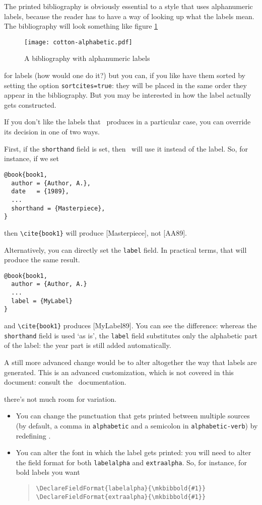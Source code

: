 The printed bibliography is obviously essential to a style that uses
alphanumeric labels, because the reader has to have a way of looking
up what the labels mean. The bibliography will look something like
figure \ref{example:bibliography:alphabetic}

\begin{figure}
\caption{A bibliography with alphanumeric
  labels\label{example:bibliography:alphabetic}}
\texttt{[image: cotton-alphabetic.pdf]}
\end{figure}

 for labels (how
would one do it?) but you can, if you like have them sorted by setting
the option \verb|sortcites=true|: they will be placed in the same
order they appear in the bibliography. But you may be interested in
how the label actually gets constructed.

If you don't like the labels that \biblatex\ produces in a particular
case, you can override its decision in one of two ways.

First, if the \verb|shorthand| field is set, then \biblatex\ will use
it instead of the label. So, for instance, if we set
\begin{verbatim}
@book{book1,
  author = {Author, A.},
  date   = {1989},
  ...
  shorthand = {Masterpiece},
}
\end{verbatim}
then \verb|\cite{book1}| will produce [Masterpiece], not [AA89].

Alternatively, you can directly set the \verb|label| field. In
practical terms, that will produce the same result.
\begin{verbatim}
@book{book1,
  author = {Author, A.} 
  ...
  label = {MyLabel}
}
\end{verbatim}
and \verb|\cite{book1}| produces [MyLabel89]. You can see the difference:
whereas the \verb|shorthand| field is used `as is', the \verb|label|
field substitutes only the alphabetic part of the label: the year part
is still added automatically.

A still more advanced change would be to alter altogether the way that
labels are generated. This is an advanced customization, which is not
covered in this document: consult the \biblatex\ documentation.

 there's not much room for
variation.
\begin{itemize}
\item You can change the punctuation that gets printed between
multiple sources (by default, a comma in \verb|alphabetic| and a
semicolon in \verb|alphabetic-verb|) by redefining
.
\item You can alter the font in which the label gets printed: you will
  need to alter the field format for both \verb|labelalpha| and
  \verb|extraalpha|. So, for instance, for bold labels you want
\begin{quote}
\verb|\DeclareFieldFormat{labelalpha}{\mkbibbold{#1}}|\\
\verb|\DeclareFieldFormat{extraalpha}{\mkbibbold{#1}}|
\end{quote}
\end{itemize}

